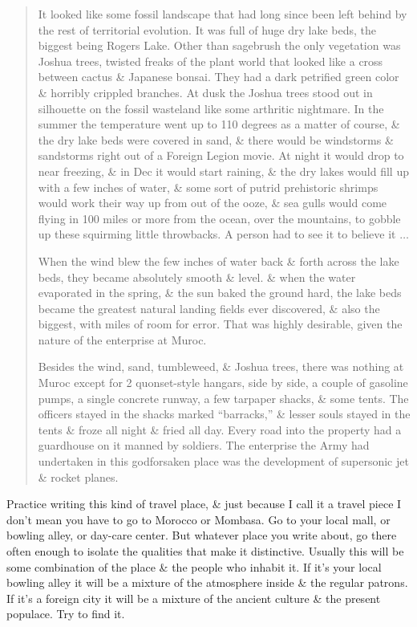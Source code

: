 \documentclass{article}
\begin{document}
\begin{quotation}
	It looked like some fossil landscape that had long since been left behind by the rest of territorial evolution. It was full of huge dry lake beds, the biggest being Rogers Lake. Other than sagebrush the only vegetation was Joshua trees, twisted freaks of the plant world that looked like a cross between cactus \& Japanese bonsai. They had a dark petrified green color \& horribly crippled branches. At dusk the Joshua trees stood out in silhouette on the fossil wasteland like some arthritic nightmare. In the summer the temperature went up to 110 degrees as a matter of course, \& the dry lake beds were covered in sand, \& there would be windstorms \& sandstorms right out of a Foreign Legion movie. At night it would drop to near freezing, \& in Dec it would start raining, \& the dry lakes would fill up with a few inches of water, \& some sort of putrid prehistoric shrimps would work their way up from out of the ooze, \& sea gulls would come flying in 100 miles or more from the ocean, over the mountains, to gobble up these squirming little throwbacks. A person had to see it to believe it $\ldots$
	
	When the wind blew the few inches of water back \& forth across the lake beds, they became absolutely smooth \& level. \& when the water evaporated in the spring, \& the sun baked the ground hard, the lake beds became the greatest natural landing fields ever discovered, \& also the biggest, with miles of room for error. That was highly desirable, given the nature of the enterprise at Muroc.
	
	Besides the wind, sand, tumbleweed, \& Joshua trees, there was nothing at Muroc except for 2 quonset-style hangars, side by side, a couple of gasoline pumps, a single concrete runway, a few tarpaper shacks, \& some tents. The officers stayed in the shacks marked ``barracks,'' \& lesser souls stayed in the tents \& froze all night \& fried all day. Every road into the property had a guardhouse on it manned by soldiers. The enterprise the Army had undertaken in this godforsaken place was the development of supersonic jet \& rocket planes.
\end{quotation}
Practice writing this kind of travel place, \& just because I call it a travel piece I don't mean you have to go to Morocco or Mombasa. Go to your local mall, or bowling alley, or day-care center. But whatever place you write about, go there often enough to isolate the qualities that make it distinctive. Usually this will be some combination of the place \& the people who inhabit it. If it's your local bowling alley it will be a mixture of the atmosphere inside \& the regular patrons. If it's a foreign city it will be a mixture of the ancient culture \& the present populace. Try to find it.
\end{document}
